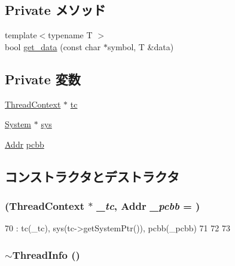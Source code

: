 \subsection*{Private メソッド}
\begin{DoxyCompactItemize}
\item 
{\footnotesize template$<$typename T $>$ }\\bool \hyperlink{classLinux_1_1ThreadInfo_af0da1d324f55329a4d5ca716b05dc79f}{get\_\-data} (const char $\ast$symbol, T \&data)
\end{DoxyCompactItemize}
\subsection*{Private 変数}
\begin{DoxyCompactItemize}
\item 
\hyperlink{classThreadContext}{ThreadContext} $\ast$ \hyperlink{classLinux_1_1ThreadInfo_a4455a4759e69e5ebe68ae7298cbcc37d}{tc}
\item 
\hyperlink{classSystem}{System} $\ast$ \hyperlink{classLinux_1_1ThreadInfo_a8ae37465ba84acfef6af3e9b9e6dbbd5}{sys}
\item 
\hyperlink{base_2types_8hh_af1bb03d6a4ee096394a6749f0a169232}{Addr} \hyperlink{classLinux_1_1ThreadInfo_a6e10da530c8ba76b721d983185b1ea8d}{pcbb}
\end{DoxyCompactItemize}


\subsection{コンストラクタとデストラクタ}
\hypertarget{classLinux_1_1ThreadInfo_ac45ecf2813a7b8622615eb399e4ef8d7}{
\subsubsection[{ThreadInfo}]{ ({\bf ThreadContext} $\ast$ {\em \_\-tc}, \/  {\bf Addr} {\em \_\-pcbb} = {})}}
\label{classLinux_1_1ThreadInfo_ac45ecf2813a7b8622615eb399e4ef8d7}



\begin{DoxyCode}
70         : tc(_tc), sys(tc->getSystemPtr()), pcbb(_pcbb)
71     {
72 
73     }
\end{DoxyCode}
\hypertarget{classLinux_1_1ThreadInfo_a4eb41aa67f0202861fc2a3862127964e}{
\subsubsection[{$\sim$ThreadInfo}]{\setlength{\rightskip}{0pt plus 5cm}$\sim${\bf ThreadInfo} ()}}
\label{classLinux_1_1ThreadInfo_a4eb41aa67f0202861fc2a3862127964e}



